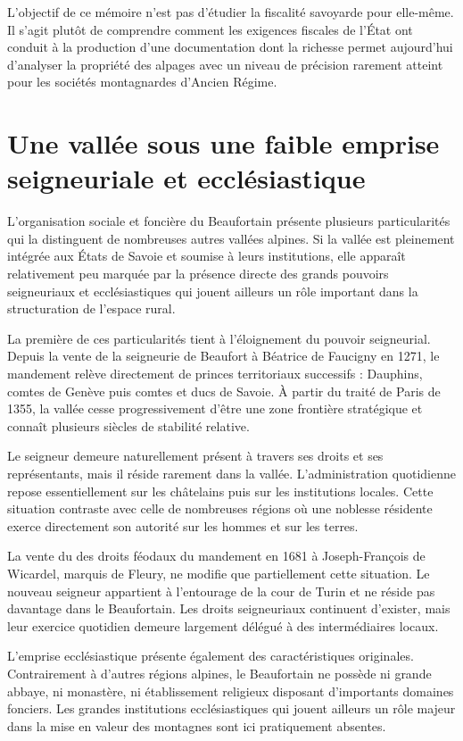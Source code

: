 \documentclass[12pt,a4paper]{report}
\begin{document}
L'objectif de ce mémoire n'est pas d'étudier la fiscalité savoyarde pour elle-même. Il s'agit plutôt de comprendre comment les exigences fiscales de l'État ont conduit à la production d'une documentation dont la richesse permet aujourd'hui d'analyser la propriété des alpages avec un niveau de précision rarement atteint pour les sociétés montagnardes d'Ancien Régime.

\section{Une vallée sous une faible emprise seigneuriale et ecclésiastique}

L'organisation sociale et foncière du Beaufortain présente plusieurs particularités qui la distinguent de nombreuses autres vallées alpines. Si la vallée est pleinement intégrée aux États de Savoie et soumise à leurs institutions, elle apparaît relativement peu marquée par la présence directe des grands pouvoirs seigneuriaux et ecclésiastiques qui jouent ailleurs un rôle important dans la structuration de l'espace rural.

La première de ces particularités tient à l'éloignement du pouvoir seigneurial. Depuis la vente de la seigneurie de Beaufort à Béatrice de Faucigny en 1271, le mandement relève directement de princes territoriaux successifs : Dauphins, comtes de Genève puis comtes et ducs de Savoie. À partir du traité de Paris de 1355, la vallée cesse progressivement d'être une zone frontière stratégique et connaît plusieurs siècles de stabilité relative.

Le seigneur demeure naturellement présent à travers ses droits et ses représentants, mais il réside rarement dans la vallée. L'administration quotidienne repose essentiellement sur les châtelains puis sur les institutions locales. Cette situation contraste avec celle de nombreuses régions où une noblesse résidente exerce directement son autorité sur les hommes et sur les terres.

La vente du des droits féodaux du mandement en 1681 à Joseph-François de Wicardel, marquis de Fleury, ne modifie que partiellement cette situation. Le nouveau seigneur appartient à l'entourage de la cour de Turin et ne réside pas davantage dans le Beaufortain. Les droits seigneuriaux continuent d'exister, mais leur exercice quotidien demeure largement délégué à des intermédiaires locaux.

L'emprise ecclésiastique présente également des caractéristiques originales. Contrairement à d'autres régions alpines, le Beaufortain ne possède ni grande abbaye, ni monastère, ni établissement religieux disposant d'importants domaines fonciers. Les grandes institutions ecclésiastiques qui jouent ailleurs un rôle majeur dans la mise en valeur des montagnes sont ici pratiquement absentes.
\end{document}
